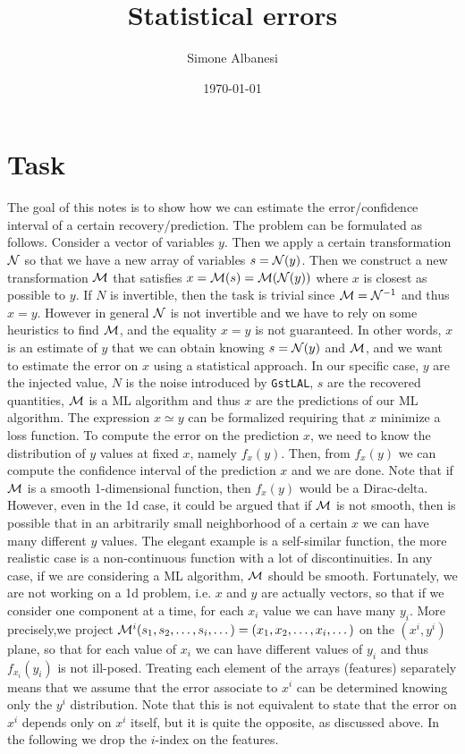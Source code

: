\documentclass[prd,aps,twocolumn,a4paper,showkeys,nofootinbib]{revtex4-1}
\def\N{{\cal N}}
\def\M{{\cal M}}
\begin{document}
	
\title{Statistical errors}

\author{Simone Albanesi}

\date{\today}

\maketitle

\section{Task}
The goal of this notes is to show how we can estimate the error/confidence interval
of a certain recovery/prediction.
The problem can be formulated as follows.
Consider a vector of variables $y$. Then we apply a certain transformation $\N$ so
that we have a new array of variables $s = \N(y)$. Then we construct
a new transformation $\M$ that satisfies $x=\M(s) = \M(\N(y))$ where
 $x$ is closest as possible to $y$. If $N$ is invertible, then the task is trivial
since $\M=\N^{-1}$ and thus $x=y$. However in general $\N$ is not invertible and we have to
rely on some heuristics to find $\M$, and the equality $x=y$ is not guaranteed. 
In other words, $x$ is an estimate of $y$ that we can obtain knowing $s=\N(y)$ and $\M$, 
and we want to estimate the error on $x$ using a statistical approach.
In our specific case, $y$ are the injected value, $N$ is the noise introduced by \texttt{GstLAL},
$s$ are the recovered quantities, $\M$ is a ML algorithm and thus $x$ are the predictions of our
ML algorithm. The expression $x \simeq y$ can be formalized requiring that $x$ minimize a loss 
function. To compute the error on the prediction $x$, we need to know the distribution 
of $y$ values at fixed $x$, namely $f_x(y)$. Then, from $f_x(y)$ we can compute the
confidence interval of the prediction $x$ and we are done. 
Note that if $\M$ is a smooth 1-dimensional function, then $f_x(y)$ would be a Dirac-delta. 
However, even in the 1d case, it could be argued that if $\M$ 
is not smooth, then is possible that in an 
arbitrarily small neighborhood of a certain $x$ we can have many different $y$ values. The elegant example 
is a self-similar function, the more realistic case is a non-continuous function with a lot of discontinuities.
In any case, if we are considering a ML algorithm, $\M$ should be smooth.
Fortunately, we are not working on a 1d problem, i.e. $x$ and $y$ are actually vectors,
so that if we consider one component at a time, for each $x_i$ value we can have many $y_i$. 
More precisely,we project
$\M^i(s_1, s_2,\dots,s_i,\dots)=(x_1,x_2,\dots,x_i,\dots)$ on the $(x^i,y^i)$ plane, so that
for each value of $x_i$ we can have different values of $y_i$ and thus $f_{x_i}(y_i)$ is not ill-posed. 
Treating each element of the arrays (features) separately means that we assume that the error associate to 
$x^i$ can be determined knowing only the $y^i$ distribution. 
Note that this is not equivalent to state that the error on $x^i$ depends only on $x^i$ itself, 
but it is quite the opposite, as discussed above.
In the following we drop the $i$-index on the features.
\end{document}

